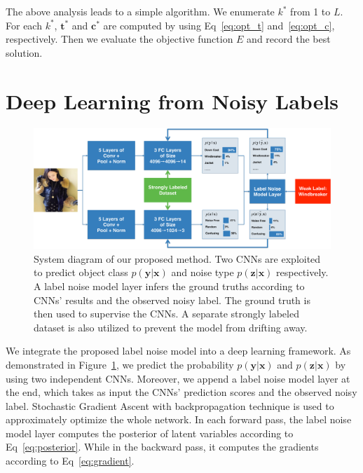\documentclass[10pt,twocolumn,letterpaper]{article}
\def\vec{\mathbf}
\begin{document}
The above analysis leads to a simple algorithm. We enumerate $k^*$ from 1 to $L$. For each $k^*$, $\vec{t}^*$ and $\vec{c}^*$ are computed by using Eq~\eqref{eq:opt_t} and~\eqref{eq:opt_c}, respectively. Then we evaluate the objective function $E$ and record the best solution.




\section{Deep Learning from Noisy Labels} %
\label{sec:deep_learning_from_noisy_labels}

\begin{figure}
\begin{center}
\includegraphics[width=0.9\linewidth]{figure/diagram.pdf}
\end{center}
\caption{System diagram of our proposed method. Two CNNs are exploited to predict object class $p(\vec{y}|\vec{x})$ and noise type $p(\vec{z}|\vec{x})$ respectively. A label noise model layer infers the ground truths according to CNNs' results and the observed noisy label. The ground truth is then used to supervise the CNNs. A separate strongly labeled dataset is also utilized to prevent the model from drifting away.}
\label{fig:framework}
\end{figure}

We integrate the proposed label noise model into a deep learning framework. As demonstrated in Figure~\ref{fig:framework}, we predict the probability $p(\vec{y}|\vec{x})$ and $p(\vec{z}|\vec{x})$ by using two independent CNNs. Moreover, we append a label noise model layer at the end, which takes as input the CNNs' prediction scores and the observed noisy label. Stochastic Gradient Ascent with backpropagation technique is used to approximately optimize the whole network. In each forward pass, the label noise model layer computes the posterior of latent variables according to Eq~\eqref{eq:posterior}. While in the backward pass, it computes the gradients according to Eq~\eqref{eq:gradient}.
\end{document}
